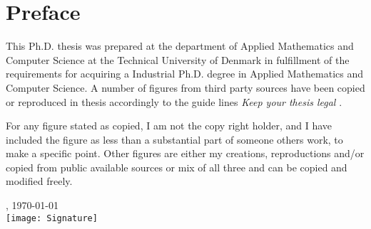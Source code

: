 \chapter{Preface}
This Ph.D. thesis was prepared at the department of Applied Mathematics and Computer Science at the Technical University of Denmark in fulfillment of the requirements for acquiring a Industrial Ph.D. degree in Applied Mathematics and Computer Science.
A number of figures from third party sources have been copied or reproduced in thesis accordingly to the guide lines \textit{Keep your thesis legal} \cite{johnson2015keeping}.

For any figure stated as copied, I am not the copy right holder, and I have included the figure as less than a substantial part of someone others work, to make a specific point. Other figures are either my creations, reproductions and/or copied from public available sources or mix of all three and can be copied and modified freely.

\vfill

{
\centering
    \thesislocation{}, \today\\[1cm]
    \hspace{3cm}\texttt{[image: Signature]}\\[1cm]
\begin{flushright}
    \thesisauthor{}
\end{flushright}
}